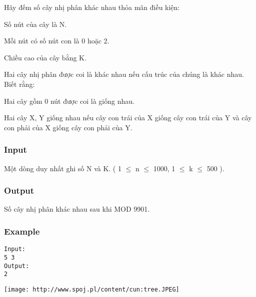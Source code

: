 



   Hãy đếm số cây nhị phân khác nhau thỏa mãn điều kiện:  

   Số nút của cây là N.  

   Mỗi nút có số nút con là 0 hoặc 2.  

   Chiều cao của cây bằng K.  

   Hai cây nhị phân được coi là khác nhau nếu cấu trúc của chúng là khác nhau. Biết rằng:  

   Hai cây gồm 0 nút được coi là giống nhau.  

   Hai cây X, Y giống nhau nếu cây con trái của X giống cây con trái của Y và cây con phải của X giống cây con phải của Y.  

\subsubsection{   Input  }

   Một dòng duy nhất ghi số N và K. ( 1  $\le$  n  $\le$  1000, 1  $\le$  k  $\le$  500 ).  

\subsubsection{   Output  }

   Số cây nhị phân khác nhau sau khi MOD 9901.  

\subsubsection{   Example  }
\begin{verbatim}
Input:
5 3
Output:
2
\end{verbatim}
\texttt{[image: http://www.spoj.pl/content/cun:tree.JPEG]}

